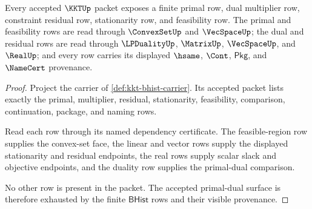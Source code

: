 \begin{theorem}
\label{thm:kkt-primal-dual-row-obligations}
Every accepted $\KKTUp$ packet exposes a finite primal row, dual multiplier row, constraint residual row, stationarity row, and feasibility row. The primal and feasibility rows are read through $\ConvexSetUp$ and $\VecSpaceUp$; the dual and residual rows are read through $\LPDualityUp$, $\MatrixUp$, $\VecSpaceUp$, and $\RealUp$; and every row carries its displayed $\hsame$, $\Cont$, $\mathsf{Pkg}$, and $\NameCert$ provenance.
\end{theorem}
\begin{proof}
Project the carrier of \autoref{def:kkt-bhist-carrier}. Its accepted packet lists exactly the primal, multiplier, residual, stationarity, feasibility, comparison, continuation, package, and naming rows.

Read each row through its named dependency certificate. The feasible-region row supplies the convex-set face, the linear and vector rows supply the displayed stationarity and residual endpoints, the real rows supply scalar slack and objective endpoints, and the duality row supplies the primal-dual comparison.

No other row is present in the packet. The accepted primal-dual surface is therefore exhausted by the finite $\mathsf{BHist}$ rows and their visible provenance.
\end{proof}

